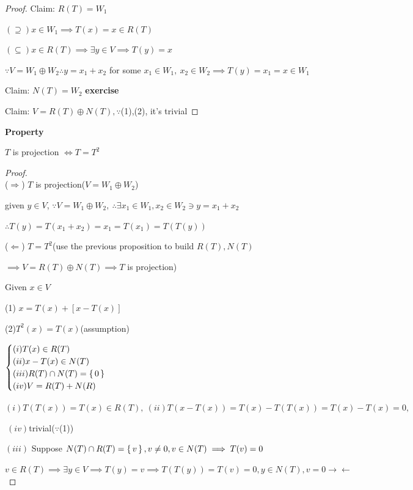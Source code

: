 \begin{proof}
	Claim: $R(T) = W_1$
	
	$(\supseteq) x \in W_1 \implies T(x) = x \in R(T)$
	
	$(\subseteq) x \in R(T) \implies \exists y \in V \implies T(y) = x $
	
	 $\because V = W_1 \oplus W_2 \therefore y = x_1+x_2$ for some $x_1 \in W_1,~x_2 \in W_2 \implies T(y) = x_1 = x \in W_1$
	 
	 Claim: $N(T) = W_2$ \textbf{exercise}
	 
	 Claim: $V = R(T) \oplus N(T),\because $(1),(2), it's trivial
\end{proof} 

\textbf{Property}

$T$ is projection $\Leftrightarrow T = T^2$

\begin{proof}$ $\\

	($\Rightarrow$) $T$ is projection($V = W_1 \oplus W_2$)
	
	given $y \in V$, $\because V = W_1 \oplus W_2,~\therefore \exists x_1 \in W_1, x_2 \in W_2 \ni y = x_1+x_2$
	
	$\therefore T(y) = T(x_1+x_2) = x_1 = T(x_1) = T(T(y))$
	
	($\Leftarrow$) $T = T^2$(use the previous proposition to build $R(T),N(T) $
	
	$\implies V = R(T)\oplus N(T) \implies T$ is projection)
	
	Given $x \in V$
	
	(1) $x = T(x)+[x-T(x)]$
	
	(2)$T^2(x) = T(x)$(assumption)
	
	$\begin{cases}
		(i) T(x) \in R(T) \\ (ii)x-T(x) \in N(T)\\(iii)R(T) \cap N(T) = \left\{ \,0 \,\right\}\\(iv)V = R(T)+N(R)
	\end{cases}$
	
	$(i)T(T(x)) = T(x) \in R(T),~(ii)T(x-T(x)) = T(x)-T(T(x))=T(x)-T(x)=0,$
	
	$~(iv)$trivial($\because $(1))
	
	$(iii)$ Suppose $N(T) \cap R(T) = \left\{ \,v \,\right\},v\neq 0,v\in N(T) \implies T(v)=0$
	
	$v \in R(T) \implies \exists y \in V \implies T(y)=v \implies T(T(y)) = T(v) = 0,y \in N(T),v=0 \rightarrow\leftarrow$
	
\end{proof}

